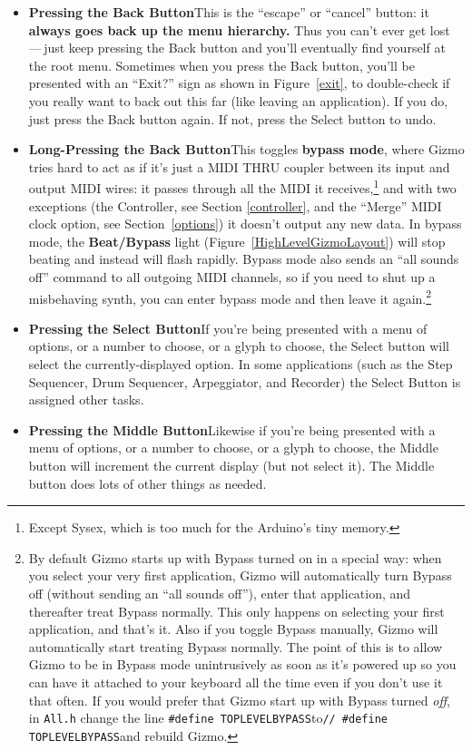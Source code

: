 \documentclass{article}
\begin{document}
\begin{itemize}
\item {\bf Pressing the Back Button}\quad This is the ``escape'' or ``cancel'' button: it {\bf always goes back up the menu hierarchy.}  Thus you can't ever get lost\,---\,just keep pressing the Back button and you'll eventually find yourself at the root menu.  Sometimes when you press the Back button, you'll be presented with an ``Exit?'' sign as shown in Figure~\ref{exit}, to double-check if you really want to back out this far (like leaving an application). If you do, just press the Back button again.  If not, press the Select button to undo.

\item {\bf Long-Pressing the Back Button}\quad This toggles {\bf bypass mode}, where Gizmo tries hard to act as if it's just a MIDI THRU coupler between its input and output MIDI wires: it passes through all the MIDI it receives,\footnote{Except Sysex, which is too much for the Arduino's tiny memory.} and with two exceptions (the Controller, see Section \ref{controller}, and the ``Merge'' MIDI clock option, see Section~\ref{options}) it doesn't output any new data.  In bypass mode, the {\bf Beat/Bypass} light (Figure~\ref{HighLevelGizmoLayout}) will stop beating and instead will flash rapidly.  Bypass mode also sends an ``all sounds off'' command to all outgoing MIDI channels, so if you need to shut up a misbehaving synth, you can enter bypass mode and then leave it again.\footnote{By default Gizmo starts up with Bypass turned on in a special way: when you select your very first application, Gizmo will automatically turn Bypass off (without sending an ``all sounds off''), enter that application, and thereafter treat Bypass normally.  This only happens on selecting your first application, and that's it.  Also if you toggle Bypass manually, Gizmo will automatically start treating Bypass normally.  The point of this is to allow Gizmo to be in Bypass mode unintrusively as soon as it's powered up so you can have it attached to your keyboard all the time even if you don't use it that often.  If you would prefer that Gizmo start up with Bypass turned {\it off}, in \texttt{All.h} change the line \texttt{\#define TOPLEVEL{\textunderscore}BYPASS}\quad to\quad\texttt{// \#define TOPLEVEL{\textunderscore}BYPASS}\quad and rebuild Gizmo.}

\item {\bf Pressing the Select Button}\quad If you're being presented with a menu of options, or a number to choose, or a glyph to choose, the Select button will select the currently-displayed option.  In some applications (such as the Step Sequencer, Drum Sequencer, Arpeggiator, and Recorder) the Select Button is assigned other tasks.

\item {\bf Pressing the Middle Button}\quad Likewise if you're being presented with a menu of options, or a number to choose, or a glyph to choose, the Middle button will increment the current display (but not select it).   The Middle button does lots of other things as needed.
\end{itemize}
\end{document}

